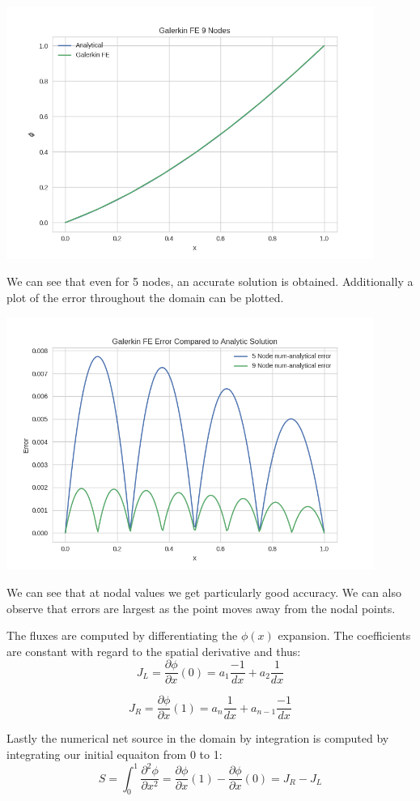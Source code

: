 \documentclass[11pt]{article}
\begin{document}
\includegraphics[width=12cm]{./figures/9nodes.png}

We can see that even for 5 nodes, an accurate solution is obtained.
Additionally a plot of the error throughout the domain can be plotted.

\includegraphics[width=12cm]{./figures/error.png}

We can see that at nodal values we get particularly good accuracy. We can also observe that errors are largest as the point moves away from the nodal points.

The fluxes are computed by differentiating the $\phi (x)$ expansion. The coefficients are constant with regard to the spatial derivative and thus:
\[
J_{L} = \frac{\partial \phi}{\partial x} (0) = a_{1} \frac{-1}{dx} + a_{2} \frac{1}{dx}  
\]

\[
J_{R} = \frac{\partial \phi}{\partial x} (1) = a_{n} \frac{1}{dx} + a_{n-1} \frac{-1}{dx} 
\]

Lastly the numerical net source in the domain by integration is computed by integrating our initial equaiton from 0 to 1:
\[
S = \int_{0}^{1} \frac{\partial^{2} \phi }{\partial x^{2}} = \frac{\partial \phi}{\partial x}(1) -  \frac{\partial \phi}{\partial x}(0)  =  J_{R} -J_{L}
\] 
\end{document}
